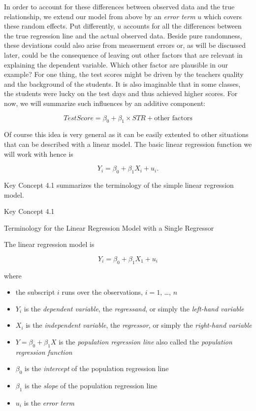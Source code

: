 \documentclass[]{book}
\providecommand{\tightlist}{%
  \setlength{\itemsep}{0pt}\setlength{\parskip}{0pt}}
\theoremstyle{definition}
\theoremstyle{definition}
\theoremstyle{definition}
\theoremstyle{remark}
\begin{document}
In order to account for these differences between observed data and the
true relationship, we extend our model from above by an \emph{error
term} \(u\) which covers these random effects. Put differently, \(u\)
accounts for all the differences between the true regression line and
the actual observed data. Beside pure randomness, these deviations could
also arise from measerment errors or, as will be discussed later, could
be the consequence of leaving out other factors that are relevant in
explaining the dependent variable. Which other factor are plausible in
our example? For one thing, the test scores might be driven by the
teachers quality and the background of the students. It is also
imaginable that in some classes, the students were lucky on the test
days and thus achieved higher scores. For now, we will summarize such
influences by an additive component:

\[ TestScore = \beta_0 + \beta_1 \times STR + \text{other factors} \]

Of course this idea is very general as it can be easily extented to
other situations that can be described with a linear model. The basic
linear regression function we will work with hence is

\[ Y_i = \beta_0 + \beta_1 X_i + u_i. \]

Key Concept 4.1 summarizes the terminology of the simple linear
regression model.

Key Concept 4.1

Terminology for the Linear Regression Model with a Single Regressor

The linear regression model is

\[Y_i = \beta_0 + \beta_1 X_1 + u_i \]

where

\begin{itemize}
\tightlist
\item
  the subscript \(i\) runs over the observations, \(i = 1\), \ldots{},
  \(n\)
\item
  \(Y_i\) is the \emph{dependent variable}, the \emph{regressand}, or
  simply the \emph{left-hand variable}
\item
  \(X_i\) is the \emph{independent variable}, the \emph{regressor}, or
  simply the \emph{right-hand variable}
\item
  \(Y = \beta_0 + \beta_1 X\) is the \emph{population regression line}
  also called the \emph{population regression function}
\item
  \(\beta_0\) is the \emph{intercept} of the population regression line
\item
  \(\beta_1\) is the \emph{slope} of the population regression line
\item
  \(u_i\) is the \emph{error term}
\end{itemize}
\end{document}

